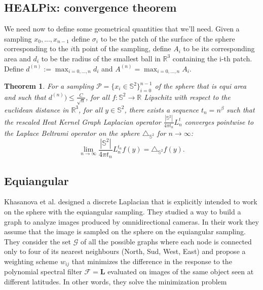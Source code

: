 \documentclass{article} %
\newtheorem{theorem}{Theorem}[section]
\begin{document}
\subsection{HEALPix: convergence theorem}
We need now to define some geometrical quantities that we'll need. Given a sampling $x_0, ..., x_{n-1}$ define $\sigma_i$ to be the patch of the surface of the sphere corresponding to the $i$th point of the sampling, define $A_i$ to be its corresponding area and $d_i$ to be the radius of the smallest ball in $\mathbb R^3$ containing the i-th patch. Define $d^{(n)} := \max_{i=0, ..., n}d_i$ and $A^{(n)}=\max_{i=0, ..., n}A_i$.\\
	\begin{theorem}
		For a sampling $\mathcal P = \{x_i\in\mathbb S^2\}_{i=0}^{n-1}$ of the sphere that is equi area and such that $d^{(n)})\leq \frac{C}{\sqrt{n}}$, for all $f: \mathbb S^2 \rightarrow \mathbb R$ Lipschitz with respect to the euclidean distance in $\mathbb R^3$, for all $y\in\mathbb S^2$, there exists a sequence $t_n = n^\beta$ such that the rescaled Heat Kernel Graph Laplacian operator $\frac{|\mathbb S^2|}{4\pi t_n}L^t_n$ converges pointwise to the Laplace Beltrami operator on the sphere $\triangle_{\mathbb S^2}$  for $n\to\infty$:
		$$ \lim_{n\to\infty}\frac{|\mathbb S^2|}{4\pi t_n} L_n^{t_n}f(y) =  \triangle_{\mathbb S^2}f(y).$$
		\label{theo:pointwise convergence in the healpix case}
	\end{theorem}
	
\subsection{Equiangular}
Khasanova et al. \cite{Frossard2017GraphBasedCO} designed a discrete Laplacian that is explicitly intended to work on the sphere with the equiangular sampling. They studied a way to build a graph to analyze images produced by omnidirectional cameras. In their work they assume that the image is sampled on the sphere on the equiangular sampling. They consider the set $\mathcal G$ of all the possible graphs where each node is connected only to four of its nearest neighbours (North, Sud, West, East) and propose a weighting scheme $w_{ij}$ that minimizes the difference in the response to the polynomial spectral filter $\mathcal F = \mathbf L$ evaluated on images of the same object seen at different latitudes. In other words, they solve the minimization problem
\end{document}
